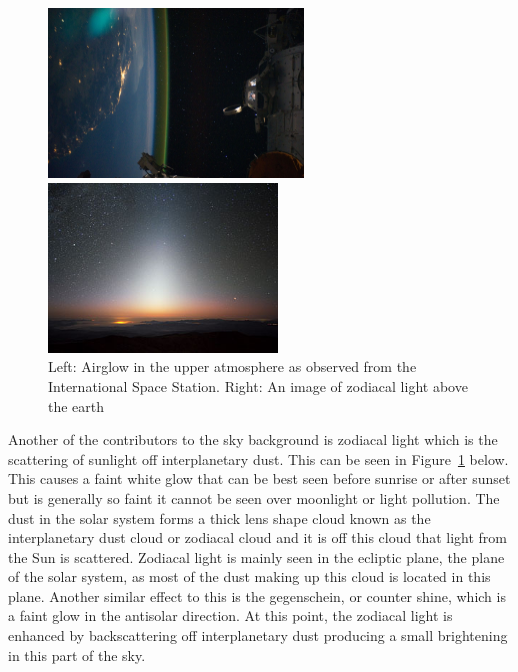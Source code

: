 			\begin{figure}[htbp]
				\begin{minipage}[c]{0.5\linewidth}
					\centering
					\includegraphics[height=4.5cm]{../Images/airglow_in_upper_atmosphere.jpeg}
				\end{minipage}
				\begin{minipage}[c]{0.5\linewidth}
					\centering
					\includegraphics[height=4.5cm]{../Images/zodiacal_light.jpeg}
				\end{minipage}
				\caption{Left: Airglow in the upper atmosphere as observed from the International Space Station\cite{ISS028_E_050185}. Right: An image of zodiacal light above the earth}\label{fig:air_glow_in_upper_atmosphere}
			\end{figure}

			Another of the contributors to the sky background is zodiacal light which is the scattering of sunlight off interplanetary dust\cite[p.~5--6]{MNRMNR21602}. This can be seen in Figure~\ref{fig:air_glow_in_upper_atmosphere} below. This causes a faint white glow that can be best seen before sunrise or after sunset but is generally so faint it cannot be seen over moonlight or light pollution. The dust in the solar system forms a thick lens shape cloud known as the interplanetary dust cloud or zodiacal cloud and it is off this cloud that light from the Sun is scattered. Zodiacal light is mainly seen in the ecliptic plane, the plane of the solar system, as most of the dust making up this cloud is located in this plane. Another similar effect to this is the gegenschein, or counter shine, which is a faint glow in the antisolar direction\cite{Observational_Studies_of_Interplanetary_Dust}. At this point, the zodiacal light is enhanced by backscattering off interplanetary dust producing a small brightening in this part of the sky.

